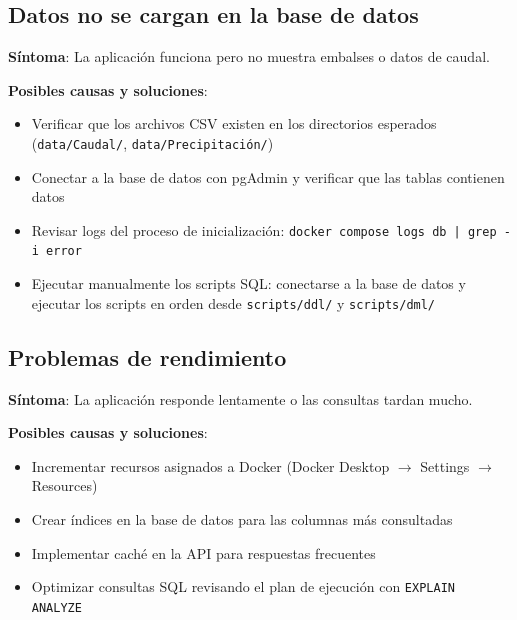 \subsection{Datos no se cargan en la base de datos}
\label{subsec:chp7-8-3}

\textbf{Síntoma}: La aplicación funciona pero no muestra embalses o datos de caudal.

\textbf{Posibles causas y soluciones}:

\begin{itemize}
    \item Verificar que los archivos CSV existen en los directorios esperados (\lstinline[style=bash]|data/Caudal/|, \lstinline[style=bash]|data/Precipitación/|)
    \item Conectar a la base de datos con pgAdmin y verificar que las tablas contienen datos
    \item Revisar logs del proceso de inicialización: \lstinline[style=bash]$docker compose logs db | grep -i error$
    \item Ejecutar manualmente los scripts SQL: conectarse a la base de datos y ejecutar los scripts en orden desde \lstinline[style=bash]|scripts/ddl/| y \lstinline[style=bash]|scripts/dml/|
\end{itemize}

\subsection{Problemas de rendimiento}
\label{subsec:chp7-8-4}

\textbf{Síntoma}: La aplicación responde lentamente o las consultas tardan mucho.

\textbf{Posibles causas y soluciones}:

\begin{itemize}
    \item Incrementar recursos asignados a Docker (Docker Desktop $\rightarrow$ Settings $\rightarrow$ Resources)
    \item Crear índices en la base de datos para las columnas más consultadas
    \item Implementar caché en la API para respuestas frecuentes
    \item Optimizar consultas SQL revisando el plan de ejecución con \lstinline[style=bash]|EXPLAIN ANALYZE|
\end{itemize}


